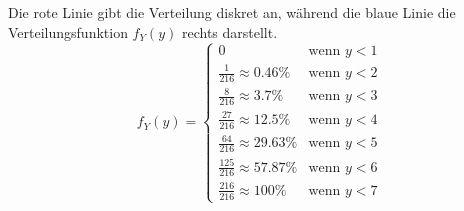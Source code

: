 \documentclass{scrreprt}
\begin{document}
\begin{uebsp}
\begin{Answer}
\begin{enumerate}[1.]
\begin{multicols}{2}
                Die rote Linie gibt die Verteilung diskret an, während die blaue Linie die Verteilungsfunktion $f_Y(y)$ rechts darstellt.
            \columnbreak
            \[f_Y(y) = \begin{cases} 
                        0 &\mbox{wenn } y < 1 \\
                        \frac{1}{216}\approx 0.46\% & \mbox{wenn } y < 2\\
                        \frac{8}{216}\approx 3.7\% & \mbox{wenn } y < 3\\
                        \frac{27}{216}\approx 12.5\% & \mbox{wenn } y < 4\\
                        \frac{64}{216}\approx 29.63\% & \mbox{wenn } y < 5\\
                        \frac{125}{216}\approx 57.87\% & \mbox{wenn } y < 6\\
                        \frac{216}{216}\approx 100\% & \mbox{wenn } y < 7 
                        \end{cases}\]
            \end{multicols}

    \end{enumerate}
\end{Answer}
\end{uebsp}
\end{document}
